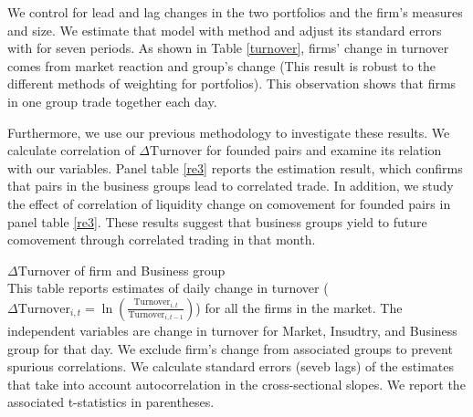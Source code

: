 		
	  We control for lead and lag changes in the two portfolios and the firm's measures and size. We estimate that model with \cite{FamaMacBeth} method and adjust its standard errors with \cite{newey1987hypothesis} for seven periods.  As shown in Table \ref{turnover}, firms' change in turnover comes from market reaction and group's change (This result is robust to the different methods of weighting for portfolios). This observation shows that firms in one group trade together each day. 
	
	Furthermore, we use our previous methodology to investigate these results. We calculate correlation of $ \Delta \text{Turnover} $ for founded pairs and examine its relation with our variables. Panel  table \ref{re3} reports the estimation result, which confirms that pairs in the business groups lead to correlated trade. In addition, we study the effect of correlation of liquidity change on comovement for founded pairs in  panel  table \ref{re3}. These results suggest that business groups yield to future comovement through correlated trading in that month.
  
  
  
  
  
  
{\begin{table}[htbp]
	\centering
	\caption{$\Delta \text{Turnover}$ of firm and Business group\\
	This table reports \cite{FamaMacBeth} estimates of daily change in turnover ($ \Delta \text{Turnover}_{i,t} = \ln(\frac{\text{Turnover}_{i,t}}{\text{Turnover}_{i,t-1}}) $) for all the firms in the market. The independent variables are change in turnover for Market, Insudtry, and Business group for that day. We exclude firm's change from associated groups to prevent spurious correlations. We calculate \cite{newey1987hypothesis} standard errors (seveb lags) of the \cite{FamaMacBeth} estimates that take into account autocorrelation in the cross-sectional slopes. We report the associated t-statistics in parentheses. }
		\label{turnover}
	\resizebox{!}{!}{
		
	} 
\end{table}}

